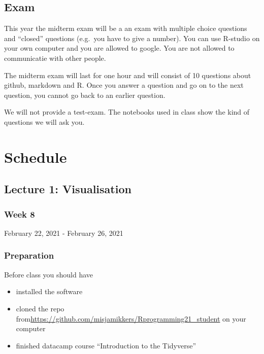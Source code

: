 \documentclass[
]{book}
\providecommand{\tightlist}{%
  \setlength{\itemsep}{0pt}\setlength{\parskip}{0pt}}
\begin{document}
\hypertarget{exam}{%
\section{Exam}\label{exam}}

This year the midterm exam will be a an exam with multiple choice questions and ``closed'' questions (e.g.~you have to give a number). You can use R-studio on your own computer and you are allowed to google. You are not allowed to communicatie with other people.

The midterm exam will last for one hour and will consist of 10 questions about github, markdown and R. Once you answer a question and go on to the next question, you cannot go back to an earlier question.

We will not provide a test-exam. The notebooks used in class show the kind of questions we will ask you.

\hypertarget{schedule}{%
\chapter{Schedule}\label{schedule}}

\hypertarget{lecture-1-visualisation}{%
\section{Lecture 1: Visualisation}\label{lecture-1-visualisation}}

\hypertarget{week-8}{%
\subsection{Week 8}\label{week-8}}

February 22, 2021 - February 26, 2021

\hypertarget{preparation}{%
\subsection{Preparation}\label{preparation}}

Before class you should have

\begin{itemize}
\tightlist
\item
  installed the software
\item
  cloned the repo from\url{https://github.com/misjamikkers/Rprogramming21_student} on your computer
\item
  finished datacamp course ``Introduction to the Tidyverse''
\end{itemize}
\end{document}

